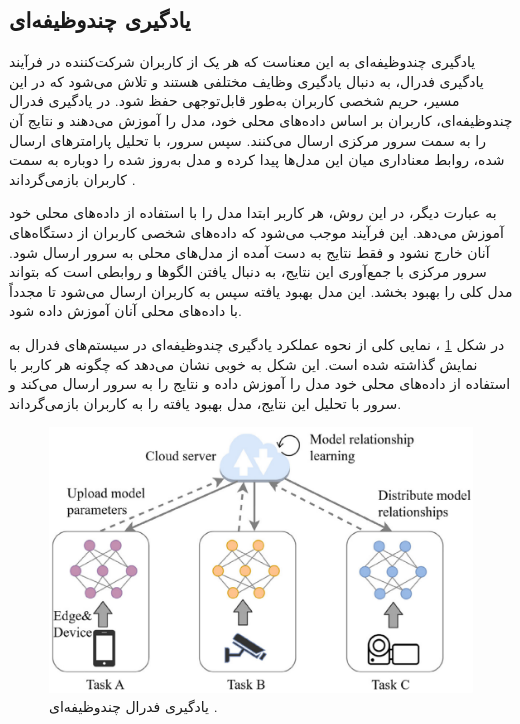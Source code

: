\subsection{یادگیری چندوظیفه‌ای}
یادگیری چندوظیفه‌ای به این معناست که هر یک از کاربران شرکت‌کننده در فرآیند یادگیری فدرال، به دنبال یادگیری وظایف مختلفی هستند و تلاش می‌شود که در این مسیر، حریم شخصی کاربران به‌طور قابل‌توجهی حفظ شود. در یادگیری فدرال چندوظیفه‌ای، کاربران بر اساس داده‌های محلی خود، مدل را آموزش می‌دهند و نتایج آن را به سمت سرور مرکزی ارسال می‌کنند. سپس سرور، با تحلیل پارامترهای ارسال شده، روابط معناداری میان این مدل‌ها پیدا کرده و مدل به‌روز شده را دوباره به سمت کاربران بازمی‌گرداند
\cite{corinzia2019variational}.

به عبارت دیگر، در این روش، هر کاربر ابتدا مدل را با استفاده از داده‌های محلی خود آموزش می‌دهد. این فرآیند موجب می‌شود که داده‌های شخصی کاربران از دستگاه‌های آنان خارج نشود و فقط نتایج به دست آمده از مدل‌های محلی به سرور ارسال شود. سرور مرکزی با جمع‌آوری این نتایج، به دنبال یافتن الگوها و روابطی است که بتواند مدل کلی را بهبود بخشد. این مدل بهبود یافته سپس به کاربران ارسال می‌شود تا مجدداً با داده‌های محلی آنان آموزش داده شود.

در شکل
\ref{multi_tasking}%
، نمایی کلی از نحوه عملکرد یادگیری چندوظیفه‌ای در سیستم‌های فدرال به نمایش گذاشته شده است. این شکل به خوبی نشان می‌دهد که چگونه هر کاربر با استفاده از داده‌های محلی خود مدل را آموزش داده و نتایج را به سرور ارسال می‌کند و سرور با تحلیل این نتایج، مدل بهبود یافته را به کاربران بازمی‌گرداند.


\begin{figure}[t]
	\centering
	\includegraphics[scale=0.9]{images/chap3/multi_tasking.png}%
	\caption{%
		یادگیری فدرال چندوظیفه‌ای
		\cite{ma2022state}%
		.
	}
	\label{multi_tasking}
	\centering
\end{figure}


